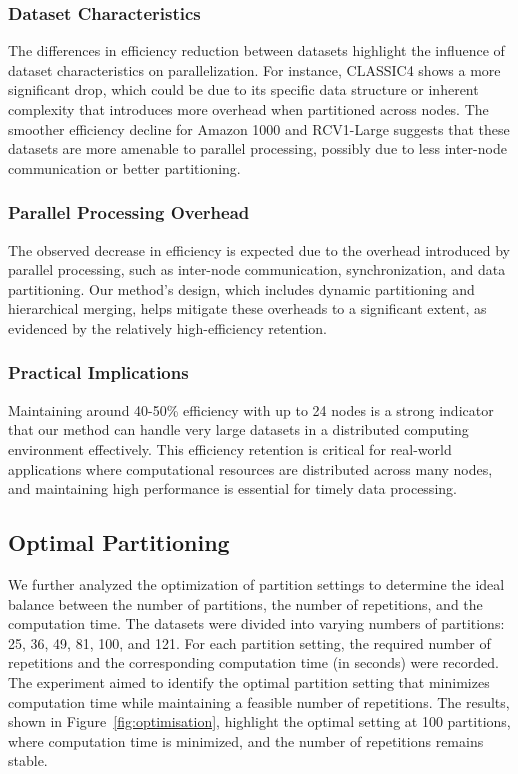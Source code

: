 \documentclass[journal]{IEEEtran}
\begin{document}
\subsubsection{Dataset Characteristics}
The differences in efficiency reduction between datasets highlight the influence of dataset characteristics on parallelization. For instance, CLASSIC4 shows a more significant drop, which could be due to its specific data structure or inherent complexity that introduces more overhead when partitioned across nodes. The smoother efficiency decline for Amazon 1000 and RCV1-Large suggests that these datasets are more amenable to parallel processing, possibly due to less inter-node communication or better partitioning.

\subsubsection{Parallel Processing Overhead}
The observed decrease in efficiency is expected due to the overhead introduced by parallel processing, such as inter-node communication, synchronization, and data partitioning. Our method's design, which includes dynamic partitioning and hierarchical merging, helps mitigate these overheads to a significant extent, as evidenced by the relatively high-efficiency retention.

\subsubsection{Practical Implications}
Maintaining around 40-50\% efficiency with up to 24 nodes is a strong indicator that our method can handle very large datasets in a distributed computing environment effectively. This efficiency retention is critical for real-world applications where computational resources are distributed across many nodes, and maintaining high performance is essential for timely data processing.

\subsection{Optimal Partitioning}

We further analyzed the optimization of partition settings to determine the ideal balance between the number of partitions, the number of repetitions, and the computation time. The datasets were divided into varying numbers of partitions: 25, 36, 49, 81, 100, and 121. For each partition setting, the required number of repetitions and the corresponding computation time (in seconds) were recorded. The experiment aimed to identify the optimal partition setting that minimizes computation time while maintaining a feasible number of repetitions. The results, shown in Figure~\ref{fig:optimisation}, highlight the optimal setting at 100 partitions, where computation time is minimized, and the number of repetitions remains stable.
\end{document}
